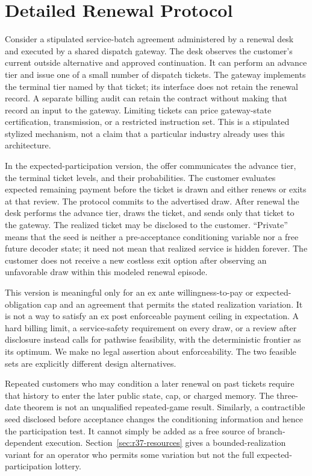 \section{Detailed Renewal Protocol}

Consider a stipulated service-batch agreement administered by a renewal desk and executed by a shared dispatch gateway. The desk observes the customer's current outside alternative and approved continuation. It can perform an advance tier and issue one of a small number of dispatch tickets. The gateway implements the terminal tier named by that ticket; its interface does not retain the renewal record. A separate billing audit can retain the contract without making that record an input to the gateway. Limiting tickets can price gateway-state certification, transmission, or a restricted instruction set. This is a stipulated stylized mechanism, not a claim that a particular industry already uses this architecture.

In the expected-participation version, the offer communicates the advance tier, the terminal ticket levels, and their probabilities. The customer evaluates expected remaining payment before the ticket is drawn and either renews or exits at that review. The protocol commits to the advertised draw. After renewal the desk performs the advance tier, draws the ticket, and sends only that ticket to the gateway. The realized ticket may be disclosed to the customer. ``Private'' means that the seed is neither a pre-acceptance conditioning variable nor a free future decoder state; it need not mean that realized service is hidden forever. The customer does not receive a new costless exit option after observing an unfavorable draw within this modeled renewal episode.

This version is meaningful only for an ex ante willingness-to-pay or expected-obligation cap and an agreement that permits the stated realization variation. It is not a way to satisfy an ex post enforceable payment ceiling in expectation. A hard billing limit, a service-safety requirement on every draw, or a review after disclosure instead calls for pathwise feasibility, with the deterministic frontier as its optimum. We make no legal assertion about enforceability. The two feasible sets are explicitly different design alternatives.

Repeated customers who may condition a later renewal on past tickets require that history to enter the later public state, cap, or charged memory. The three-date theorem is not an unqualified repeated-game result. Similarly, a contractible seed disclosed before acceptance changes the conditioning information and hence the participation test. It cannot simply be added as a free source of branch-dependent execution. Section~\ref{sec:r37-resources} gives a bounded-realization variant for an operator who permits some variation but not the full expected-participation lottery.
